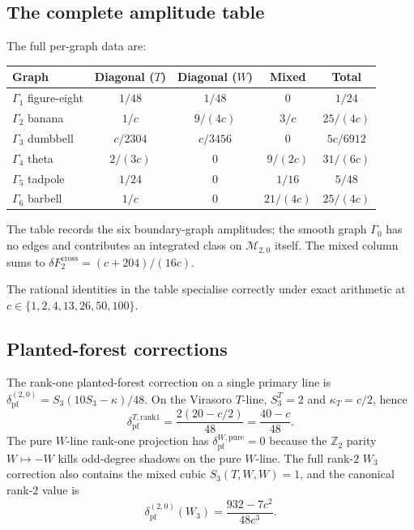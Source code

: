 \documentclass[11pt]{article}
\theoremstyle{plain}
\theoremstyle{definition}
\theoremstyle{remark}
\begin{document}
\subsection{The complete amplitude table}
\label{subsec:amplitude-table}

The full per-graph data are:

\begin{center}
\small
\renewcommand{\arraystretch}{1.3}
\begin{tabular}{lcccc}
\textbf{Graph}
& \textbf{Diagonal ($T$)}
& \textbf{Diagonal ($W$)}
& \textbf{Mixed}
& \textbf{Total} \\
\hline
$\Gamma_1$ figure-eight
& $1/48$ & $1/48$ & $0$ & $1/24$ \\[2pt]
$\Gamma_2$ banana
& $1/c$ & $9/(4c)$ & $3/c$ & $25/(4c)$ \\[2pt]
$\Gamma_3$ dumbbell
& $c/2304$ & $c/3456$ & $0$ & $5c/6912$ \\[2pt]
$\Gamma_4$ theta
& $2/(3c)$ & $0$ & $9/(2c)$ & $31/(6c)$ \\[2pt]
$\Gamma_5$ tadpole
& $1/24$ & $0$ & $1/16$ & $5/48$ \\[2pt]
$\Gamma_6$ barbell
& $1/c$ & $0$ & $21/(4c)$ & $25/(4c)$ \\
\end{tabular}
\end{center}

The table records the six boundary-graph amplitudes; the
smooth graph $\Gamma_0$ has no edges and contributes an
integrated class on $\mathcal{M}_{2,0}$ itself.
The mixed column sums to
$\delta F_2^{\mathrm{cross}} = (c+204)/(16c)$.

The rational identities in the table specialise correctly under exact
arithmetic at $c\in\{1,2,4,13,26,50,100\}$.


\subsection{Planted-forest corrections}
\label{subsec:planted-forest}

The rank-one planted-forest correction on a single primary line is
$\delta_{\mathrm{pf}}^{(2,0)} = S_3(10 S_3 - \kappa)/48$. On the
Virasoro $T$-line, $S_3^T=2$ and $\kappa_T=c/2$, hence
\begin{equation}\label{eq:pf-T}
\delta_{\mathrm{pf}}^{T,\mathrm{rank1}}
= \frac{2(20 - c/2)}{48}
= \frac{40 - c}{48}.
\end{equation}
The pure $W$-line rank-one projection has
$\delta_{\mathrm{pf}}^{W,\mathrm{pure}}=0$ because the
$\mathbb{Z}_2$ parity $W\mapsto -W$ kills odd-degree shadows on the
pure $W$-line. The full rank-$2$ $W_3$ correction also contains the
mixed cubic $S_3(T,W,W)=1$, and the canonical rank-$2$ value is
\begin{equation}\label{eq:pf-w3-rank2}
\delta_{\mathrm{pf}}^{(2,0)}(W_3)
=\frac{932-7c^2}{48c^3}.
\end{equation}
\end{document}
